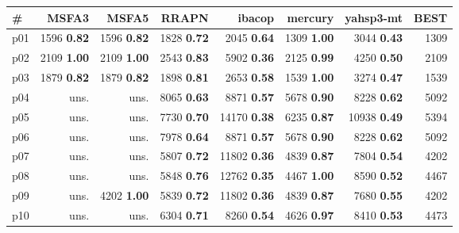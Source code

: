 \begin{tabular}{|l|rrrrrr|r|}
\hline
\textbf{\#} & \textbf{MSFA3} & \textbf{MSFA5} & \textbf{RRAPN} & \textbf{ibacop} & \textbf{mercury} & \textbf{yahsp3-mt} & \textbf{BEST}\\
\hline
p01 & {\footnotesize 1596} \textbf{0.82} & {\footnotesize 1596} \textbf{0.82} & {\footnotesize 1828} \textbf{0.72} & {\footnotesize 2045} \textbf{0.64} & {\footnotesize 1309} \textbf{1.00} & {\footnotesize 3044} \textbf{0.43} & 1309\\
p02 & {\footnotesize 2109} \textbf{1.00} & {\footnotesize 2109} \textbf{1.00} & {\footnotesize 2543} \textbf{0.83} & {\footnotesize 5902} \textbf{0.36} & {\footnotesize 2125} \textbf{0.99} & {\footnotesize 4250} \textbf{0.50} & 2109\\
p03 & {\footnotesize 1879} \textbf{0.82} & {\footnotesize 1879} \textbf{0.82} & {\footnotesize 1898} \textbf{0.81} & {\footnotesize 2653} \textbf{0.58} & {\footnotesize 1539} \textbf{1.00} & {\footnotesize 3274} \textbf{0.47} & 1539\\
p04 & uns. & uns. & {\footnotesize 8065} \textbf{0.63} & {\footnotesize 8871} \textbf{0.57} & {\footnotesize 5678} \textbf{0.90} & {\footnotesize 8228} \textbf{0.62} & 5092\\
p05 & uns. & uns. & {\footnotesize 7730} \textbf{0.70} & {\footnotesize 14170} \textbf{0.38} & {\footnotesize 6235} \textbf{0.87} & {\footnotesize 10938} \textbf{0.49} & 5394\\
p06 & uns. & uns. & {\footnotesize 7978} \textbf{0.64} & {\footnotesize 8871} \textbf{0.57} & {\footnotesize 5678} \textbf{0.90} & {\footnotesize 8228} \textbf{0.62} & 5092\\
p07 & uns. & uns. & {\footnotesize 5807} \textbf{0.72} & {\footnotesize 11802} \textbf{0.36} & {\footnotesize 4839} \textbf{0.87} & {\footnotesize 7804} \textbf{0.54} & 4202\\
p08 & uns. & uns. & {\footnotesize 5848} \textbf{0.76} & {\footnotesize 12762} \textbf{0.35} & {\footnotesize 4467} \textbf{1.00} & {\footnotesize 8590} \textbf{0.52} & 4467\\
p09 & uns. & {\footnotesize 4202} \textbf{1.00} & {\footnotesize 5839} \textbf{0.72} & {\footnotesize 11802} \textbf{0.36} & {\footnotesize 4839} \textbf{0.87} & {\footnotesize 7680} \textbf{0.55} & 4202\\
p10 & uns. & uns. & {\footnotesize 6304} \textbf{0.71} & {\footnotesize 8260} \textbf{0.54} & {\footnotesize 4626} \textbf{0.97} & {\footnotesize 8410} \textbf{0.53} & 4473\\

\end{tabular}
